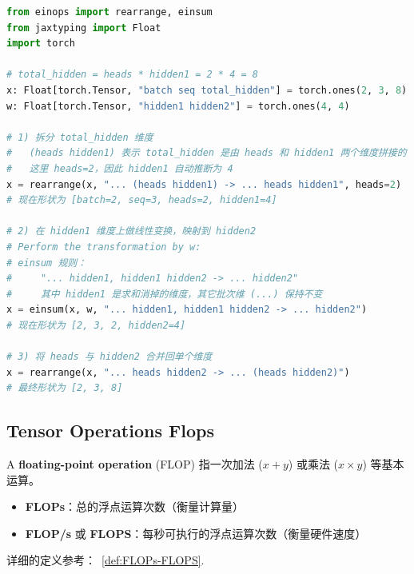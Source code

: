 \begin{lstlisting}[language=Python]
from einops import rearrange, einsum
from jaxtyping import Float
import torch

# total_hidden = heads * hidden1 = 2 * 4 = 8
x: Float[torch.Tensor, "batch seq total_hidden"] = torch.ones(2, 3, 8)
w: Float[torch.Tensor, "hidden1 hidden2"] = torch.ones(4, 4)

# 1) 拆分 total_hidden 维度
#   (heads hidden1) 表示 total_hidden 是由 heads 和 hidden1 两个维度拼接的
#   这里 heads=2，因此 hidden1 自动推断为 4
x = rearrange(x, "... (heads hidden1) -> ... heads hidden1", heads=2)
# 现在形状为 [batch=2, seq=3, heads=2, hidden1=4]

# 2) 在 hidden1 维度上做线性变换，映射到 hidden2
# Perform the transformation by w:
# einsum 规则：
#     "... hidden1, hidden1 hidden2 -> ... hidden2"
#     其中 hidden1 是求和消掉的维度，其它批次维 (...) 保持不变
x = einsum(x, w, "... hidden1, hidden1 hidden2 -> ... hidden2")
# 现在形状为 [2, 3, 2, hidden2=4]

# 3) 将 heads 与 hidden2 合并回单个维度
x = rearrange(x, "... heads hidden2 -> ... (heads hidden2)")
# 最终形状为 [2, 3, 8]

\end{lstlisting}





\clearpage
\subsection{Tensor Operations Flops}

A \textbf{floating-point operation} (FLOP) 指一次加法 (\(x + y\)) 或乘法 (\(x \times y\)) 等基本运算。

\begin{itemize}
    \item \textbf{FLOPs}：总的浮点运算次数（衡量计算量）
    \item \textbf{FLOP/s} 或 \textbf{FLOPS}：每秒可执行的浮点运算次数（衡量硬件速度）
\end{itemize}
详细的定义参考：~\ref{def:FLOPs-FLOPS}.



